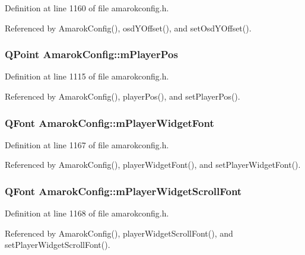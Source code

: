 Definition at line 1160 of file amarokconfig.h.

Referenced by Amarok\-Config(), osd\-YOffset(), and set\-Osd\-YOffset().
\subsubsection{\setlength{\rightskip}{0pt plus 5cm}QPoint {\bf Amarok\-Config::m\-Player\-Pos}\hspace{0.3cm}{\tt  [protected]}}\label{classAmarokConfig_AmarokConfigp1}




Definition at line 1115 of file amarokconfig.h.

Referenced by Amarok\-Config(), player\-Pos(), and set\-Player\-Pos().
\subsubsection{\setlength{\rightskip}{0pt plus 5cm}QFont {\bf Amarok\-Config::m\-Player\-Widget\-Font}\hspace{0.3cm}{\tt  [protected]}}\label{classAmarokConfig_AmarokConfigp47}




Definition at line 1167 of file amarokconfig.h.

Referenced by Amarok\-Config(), player\-Widget\-Font(), and set\-Player\-Widget\-Font().
\subsubsection{\setlength{\rightskip}{0pt plus 5cm}QFont {\bf Amarok\-Config::m\-Player\-Widget\-Scroll\-Font}\hspace{0.3cm}{\tt  [protected]}}\label{classAmarokConfig_AmarokConfigp48}




Definition at line 1168 of file amarokconfig.h.

Referenced by Amarok\-Config(), player\-Widget\-Scroll\-Font(), and set\-Player\-Widget\-Scroll\-Font().
